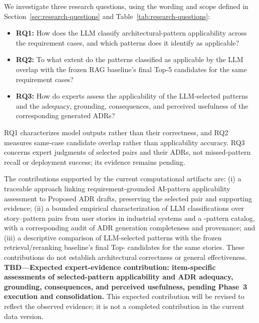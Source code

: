 We investigate three research questions, using the wording and scope defined in
Section~\ref{sec:research-questions} and Table~\ref{tab:research-questions}:
\begin{itemize}
    \item \textbf{RQ1:}
How does the LLM classify architectural-pattern applicability across the requirement cases, and which patterns does it identify as applicable?
    \item \textbf{RQ2:}
To what extent do the patterns classified as applicable by the LLM overlap with the frozen RAG baseline's final Top-5 candidates for the same requirement cases?
    \item \textbf{RQ3:}
How do experts assess the applicability of the LLM-selected patterns and the adequacy, grounding, consequences, and perceived usefulness of the corresponding generated ADRs?
\end{itemize}
RQ1 characterizes model outputs rather than their correctness, and RQ2 measures
same-case candidate overlap rather than applicability accuracy. RQ3 concerns
expert judgments of selected pairs and their ADRs, not missed-pattern recall or
deployment success; its evidence remains pending.

The contributions supported by the current computational artifacts are:
(i) a traceable approach linking requirement-grounded AI-pattern applicability
assessment to Proposed ADR drafts, preserving the selected pair and supporting
evidence; (ii) a bounded empirical characterization of LLM classifications over
\StudyAssessmentCount{} story--pattern pairs from \StudyStoryCount{} user
stories in \StudySystemCount{} industrial systems and a
\StudyPatternCount{}-pattern catalog, with a corresponding audit of ADR
generation completeness and provenance; and (iii) a descriptive comparison of
LLM-selected patterns with the frozen retrieval/reranking baseline's final
Top-\RagFinalCount{} candidates for the same stories. These contributions do not
establish architectural correctness or general effectiveness.
\textbf{TBD---Expected expert-evidence contribution: item-specific assessments
of selected-pattern applicability and ADR adequacy, grounding, consequences,
and perceived usefulness, pending Phase~3 execution and consolidation.}
This expected contribution will be revised to reflect the observed evidence;
it is not a completed contribution in the current data version.

